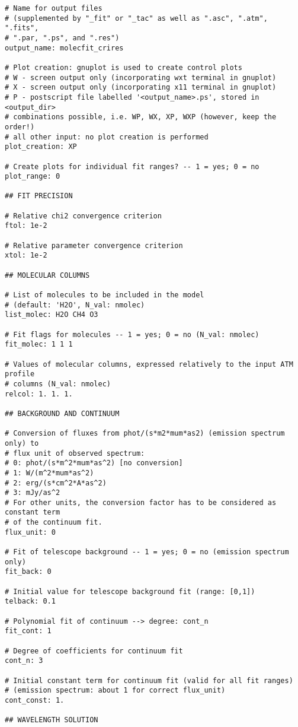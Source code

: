{\begin{verbatim}
# Name for output files
# (supplemented by "_fit" or "_tac" as well as ".asc", ".atm", ".fits",
# ".par, ".ps", and ".res")
output_name: molecfit_crires

# Plot creation: gnuplot is used to create control plots
# W - screen output only (incorporating wxt terminal in gnuplot)
# X - screen output only (incorporating x11 terminal in gnuplot)
# P - postscript file labelled '<output_name>.ps', stored in <output_dir>
# combinations possible, i.e. WP, WX, XP, WXP (however, keep the order!)
# all other input: no plot creation is performed
plot_creation: XP

# Create plots for individual fit ranges? -- 1 = yes; 0 = no
plot_range: 0

## FIT PRECISION

# Relative chi2 convergence criterion
ftol: 1e-2

# Relative parameter convergence criterion
xtol: 1e-2

## MOLECULAR COLUMNS

# List of molecules to be included in the model
# (default: 'H2O', N_val: nmolec)
list_molec: H2O CH4 O3

# Fit flags for molecules -- 1 = yes; 0 = no (N_val: nmolec)
fit_molec: 1 1 1

# Values of molecular columns, expressed relatively to the input ATM profile
# columns (N_val: nmolec)
relcol: 1. 1. 1.

## BACKGROUND AND CONTINUUM

# Conversion of fluxes from phot/(s*m2*mum*as2) (emission spectrum only) to
# flux unit of observed spectrum:
# 0: phot/(s*m^2*mum*as^2) [no conversion]
# 1: W/(m^2*mum*as^2)
# 2: erg/(s*cm^2*A*as^2)
# 3: mJy/as^2
# For other units, the conversion factor has to be considered as constant term
# of the continuum fit.
flux_unit: 0

# Fit of telescope background -- 1 = yes; 0 = no (emission spectrum only)
fit_back: 0

# Initial value for telescope background fit (range: [0,1])
telback: 0.1

# Polynomial fit of continuum --> degree: cont_n
fit_cont: 1

# Degree of coefficients for continuum fit
cont_n: 3

# Initial constant term for continuum fit (valid for all fit ranges)
# (emission spectrum: about 1 for correct flux_unit)
cont_const: 1.

## WAVELENGTH SOLUTION


\end{verbatim}}

